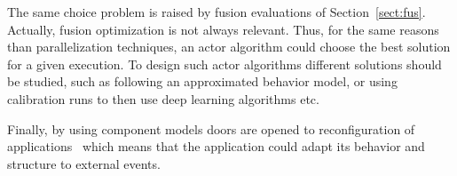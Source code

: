 The same choice problem is raised by fusion evaluations of Section~\ref{sect:fus}. Actually, fusion optimization is not always relevant. Thus, for the same reasons than parallelization techniques, an actor algorithm could choose the best solution for a given execution. To design such actor algorithms different solutions should be studied, such as following an approximated behavior model, or using calibration runs to then use deep learning algorithms etc.

Finally, by using component models doors are opened to reconfiguration of applications~\cite{Lanore:2015:RCM:2737166.2737169} which means that the application could adapt its behavior and structure to external events.